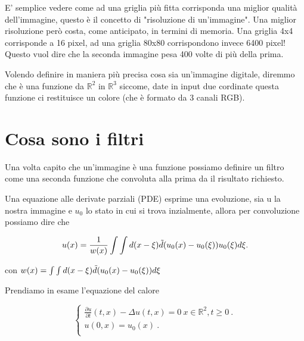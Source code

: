 E' semplice vedere come ad una griglia più fitta corrisponda una miglior qualità dell'immagine, questo è il concetto di "risoluzione di un'immagine". 
Una miglior risoluzione però costa, come anticipato, in termini di memoria. Una griglia 4x4 corrisponde a 16 pixel, ad una griglia 80x80 corrispondono invece 6400 pixel! Questo vuol dire che la seconda immagine pesa 400 volte di più della prima.


Volendo definire in maniera più precisa cosa sia un'immagine digitale, diremmo che è una funzione da $\mathbb R^2$ in $\mathbb R^3$ siccome, date in input due cordinate questa funzione ci restituisce un colore (che è formato da 3 canali RGB).

\section{Cosa sono i filtri}
Una volta capito che un'immagine è una funzione possiamo definire un filtro come una seconda funzione che convoluta alla prima da il risultato richiesto.


Una equazione alle derivate parziali (PDE) esprime una evoluzione, sia u la nostra immagine e $u_0$ lo stato in cui si trova inzialmente, allora per convoluzione possiamo dire che 

\begin{equation} \label{eq:eq3}
u(x)=\frac{1}{w(x)}\int\int d(x-\xi)\Tilde{d}(u_0(x) -u_0(\xi))u_0(\xi)d\xi.
\end{equation}

\centering con  $w(x) = \int\int d(x-\xi)\Tilde{d}(u_0(x) -u_0(\xi))d\xi$\newline


\raggedright

Prendiamo in esame l'equazione del calore



\begin{equation} \label{eq:eq2}
\begin{cases}

\frac{\partial u}{\partial t}(t,x)-\Delta u(t,x) = 0 \ x \in \mathbb R^2, t\ge 0 \ .\\ 

u(0,x) = u_0(x)\ . \\

\end{cases}
\end{equation}